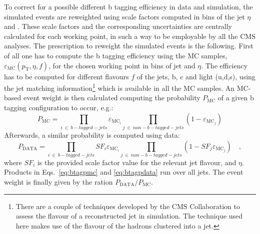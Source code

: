 To correct for a possible different b tagging efficiency in data and simulation, the simulated events are reweighted using scale factors computed in bins of the jet $\eta$ and \pt. These scale factors and the corresponding uncertainties are centrally calculated for each working point, in such a way to be employable by all the CMS analyses. The prescription to reweight the simulated events is the following. First of all one has to compute the b tagging efficiency using the MC samples, $\varepsilon_\mathrm{MC}(p_\mathrm{T}, \eta, f)$, for the chosen working point in bins of jet \pt and $\eta$. The efficiency has to be computed for different flavours $f$ of the jets, b, c and light (u,d,s), using the jet matching information\footnote{There are a couple of techniques developed by the CMS Collaboration to assess the flavour of a reconstructed jet in simulation. The technique used here makes use of the flavour of the hadrons clustered into a jet.} which is available in all the MC samples. An MC-based event weight is then calculated computing the probability $P_\mathrm{MC}$ of a given b tagging configuration to occur, e.g.:
\begin{equation}
P_\mathrm{MC}=\prod_{i~\in{}~b-tagged-jets}\varepsilon_{\mathrm{MC}_{i}}\prod_{j~\in{}~non-b-tagged-jets}(1-\varepsilon_{\mathrm{MC}_{j}})
\label{eq:btagpmc}
\end{equation}
Afterwards, a similar probability is computed using data:
\begin{equation}
P_\mathrm{DATA}=\prod_{i~\in{}~b-tagged-jets}SF_{i}\varepsilon_{\mathrm{MC}_{i}}\prod_{j~\in{}~non-b-tagged-jets}(1-SF_{j}\varepsilon_{\mathrm{MC}_{j}}) \quad ,
\label{eq:btagpdata}
\end{equation}
where $SF_{i}$ is the provided scale factor value for the relevant jet flavour, \pt and $\eta$. Products in Eqs.~\ref{eq:btagpmc} and \ref{eq:btagpdata} run over all jets. The event weight is finally given by the ration $P_\mathrm{DATA}/P_\mathrm{MC}$.

